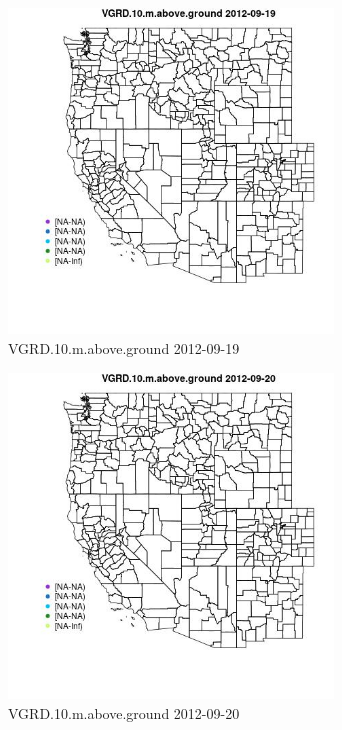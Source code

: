 \clearpage 

\begin{figure} 
\centering  
\includegraphics[width=0.77\textwidth]{Code_Outputs/ML_input_report_ML_input_PM25_Step5_part_d_de_duplicated_aves_ML_input_MapObsVGRD10maboveground2012-09-19.jpg} 
\caption{\label{fig:ML_input_report_ML_input_PM25_Step5_part_d_de_duplicated_aves_ML_inputMapObsVGRD10maboveground2012-09-19}VGRD.10.m.above.ground 2012-09-19} 
\end{figure} 
 

\begin{figure} 
\centering  
\includegraphics[width=0.77\textwidth]{Code_Outputs/ML_input_report_ML_input_PM25_Step5_part_d_de_duplicated_aves_ML_input_MapObsVGRD10maboveground2012-09-20.jpg} 
\caption{\label{fig:ML_input_report_ML_input_PM25_Step5_part_d_de_duplicated_aves_ML_inputMapObsVGRD10maboveground2012-09-20}VGRD.10.m.above.ground 2012-09-20} 
\end{figure} 
 

